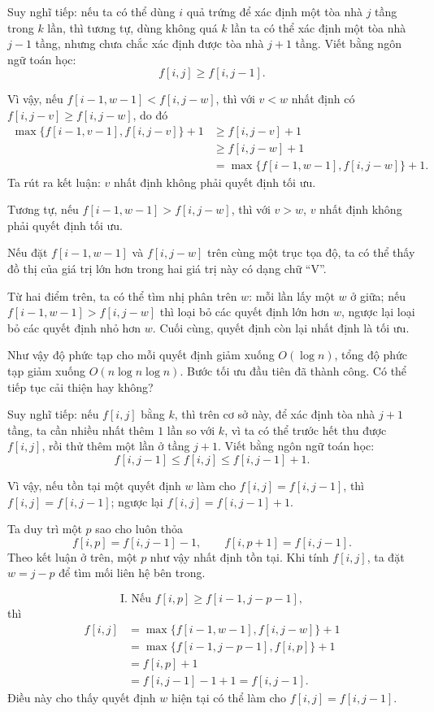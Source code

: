 \documentclass[11pt]{article}
\begin{document}
Suy nghĩ tiếp: nếu ta có thể dùng $i$ quả trứng để xác định một tòa nhà $j$
tầng trong $k$ lần, thì tương tự, dùng không quá $k$ lần ta có thể xác định
một tòa nhà $j-1$ tầng, nhưng chưa chắc xác định được tòa nhà $j+1$ tầng.
Viết bằng ngôn ngữ toán học:
\[
  f[i,j]\ge f[i,j-1].
\]

Vì vậy, nếu $f[i-1,w-1]<f[i,j-w]$, thì với $v<w$ nhất định có
$f[i,j-v]\ge f[i,j-w]$, do đó
\[
\begin{aligned}
  \max\{f[i-1,v-1],f[i,j-v]\}+1
  &\ge f[i,j-v]+1 \\
  &\ge f[i,j-w]+1 \\
  &= \max\{f[i-1,w-1],f[i,j-w]\}+1.
\end{aligned}
\]
Ta rút ra kết luận: $v$ nhất định không phải quyết định tối ưu.

Tương tự, nếu $f[i-1,w-1]>f[i,j-w]$, thì với $v>w$, $v$ nhất định không phải
quyết định tối ưu.

Nếu đặt $f[i-1,w-1]$ và $f[i,j-w]$ trên cùng một trục tọa độ, ta có thể thấy
đồ thị của giá trị lớn hơn trong hai giá trị này có dạng chữ ``V''.

Từ hai điểm trên, ta có thể tìm nhị phân trên $w$: mỗi lần lấy một $w$ ở giữa;
nếu $f[i-1,w-1]>f[i,j-w]$ thì loại bỏ các quyết định lớn hơn $w$, ngược lại
loại bỏ các quyết định nhỏ hơn $w$. Cuối cùng, quyết định còn lại nhất định
là tối ưu.

Như vậy độ phức tạp cho mỗi quyết định giảm xuống $O(\log n)$, tổng độ phức
tạp giảm xuống $O(n\log n\log n)$. Bước tối ưu đầu tiên đã thành công. Có thể
tiếp tục cải thiện hay không?

Suy nghĩ tiếp: nếu $f[i,j]$ bằng $k$, thì trên cơ sở này, để xác định tòa nhà
$j+1$ tầng, ta cần nhiều nhất thêm $1$ lần so với $k$, vì ta có thể trước hết
thu được $f[i,j]$, rồi thử thêm một lần ở tầng $j+1$. Viết bằng ngôn ngữ toán
học:
\[
  f[i,j-1]\le f[i,j]\le f[i,j-1]+1.
\]

Vì vậy, nếu tồn tại một quyết định $w$ làm cho $f[i,j]=f[i,j-1]$, thì
$f[i,j]=f[i,j-1]$; ngược lại $f[i,j]=f[i,j-1]+1$.

Ta duy trì một $p$ sao cho luôn thỏa
\[
  f[i,p]=f[i,j-1]-1,\qquad f[i,p+1]=f[i,j-1].
\]
Theo kết luận ở trên, một $p$ như vậy nhất định tồn tại. Khi tính $f[i,j]$, ta
đặt $w=j-p$ để tìm mối liên hệ bên trong.

\[
  \text{I. Nếu } f[i,p]\ge f[i-1,j-p-1],
\]
thì
\[
\begin{aligned}
  f[i,j]
  &= \max\{f[i-1,w-1],f[i,j-w]\}+1 \\
  &= \max\{f[i-1,j-p-1],f[i,p]\}+1 \\
  &= f[i,p]+1 \\
  &= f[i,j-1]-1+1=f[i,j-1].
\end{aligned}
\]
Điều này cho thấy quyết định $w$ hiện tại có thể làm cho
$f[i,j]=f[i,j-1]$.
\end{document}
